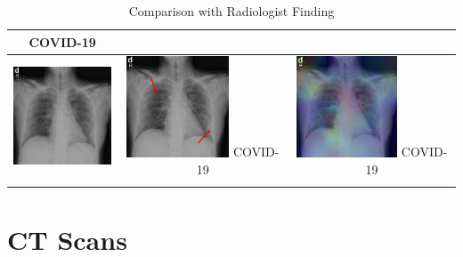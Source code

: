 \begin{longtable} { | c | c | c | }
\begin{minipage}{.3\textwidth}
      \centering COVID-19
          \vspace{0.5em}
    \end{minipage}
    \\ \hline
          \begin{minipage}{.3\textwidth}
    \vspace{1em}
      \includegraphics[width=\linewidth, height=30mm]{Images/covidOrig2.jpg}
    \vspace{0.5em}
    \end{minipage}
    &
  \begin{minipage}{.3\textwidth}
      \vspace{1em}
      \includegraphics[width=\linewidth, height=30mm]{Images/covidRadio2.png}
           \centering  COVID-19
               \vspace{0.5em}
    \end{minipage}
    & 
    \begin{minipage}{.3\textwidth}
        \vspace{1em}
      \includegraphics[width=\linewidth, height=30mm]{Images/covid19Heatmap2.jpg}
      \centering COVID-19
          \vspace{0.5em}
    \end{minipage}
    \\ \hline
  \caption{Comparison with Radiologist Finding}\label{tab:radioFinding}
\end{longtable}



\section{CT Scans}

